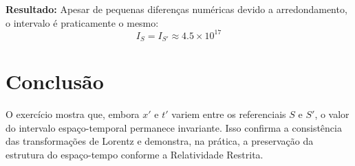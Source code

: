 \documentclass[12pt,a4paper]{article}
\begin{document}
\textbf{Resultado:}  
Apesar de pequenas diferenças numéricas devido a arredondamento, o intervalo é praticamente o mesmo:
\[
I_S = I_{S'} \approx 4.5\times10^{17}
\]

\section{Conclusão}
O exercício mostra que, embora $x'$ e $t'$ variem entre os referenciais $S$ e $S'$, o valor do intervalo espaço-temporal permanece invariante.  
Isso confirma a consistência das transformações de Lorentz e demonstra, na prática, a preservação da estrutura do espaço-tempo conforme a Relatividade Restrita.
\end{document}
